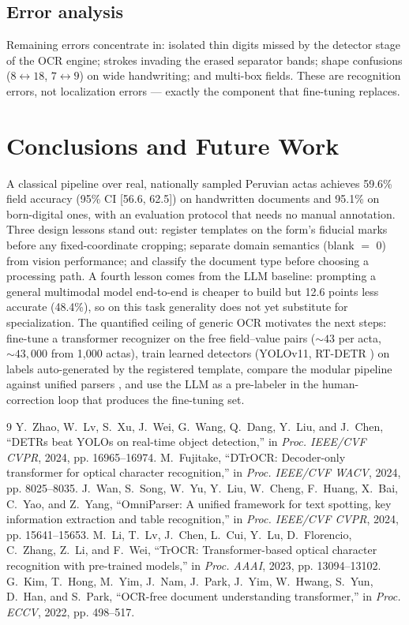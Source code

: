 \documentclass[conference]{IEEEtran}
\begin{document}
\subsection{Error analysis}
Remaining errors concentrate in: isolated thin digits missed by the detector
stage of the OCR engine; strokes invading the erased separator bands;
shape confusions ($8{\leftrightarrow}18$, $7{\leftrightarrow}9$) on wide
handwriting; and multi-box fields. These are recognition errors, not
localization errors --- exactly the component that fine-tuning replaces.

\section{Conclusions and Future Work}
A classical pipeline over real, nationally sampled Peruvian actas achieves
59.6\% field accuracy (95\% CI [56.6, 62.5]) on handwritten documents and
95.1\% on born-digital ones, with an evaluation protocol that needs no manual
annotation. Three design lessons stand out: register templates on the form's
fiducial marks before any fixed-coordinate cropping; separate domain
semantics (blank $=$ 0) from vision performance; and classify the document
type before choosing a processing path. A fourth lesson comes from the LLM
baseline: prompting a general multimodal model end-to-end is cheaper to build
but 12.6 points less accurate (48.4\%), so on this task generality does not
yet substitute for specialization. The quantified ceiling of generic
OCR motivates the next steps: fine-tune a transformer recognizer
\cite{trocr,dtrocr} on the free field--value pairs (${\sim}43$ per acta,
${\sim}43{,}000$ from 1,000 actas), train learned detectors (YOLOv11,
RT-DETR \cite{rtdetr}) on labels auto-generated by the registered template,
compare the modular pipeline against unified parsers \cite{omniparser,donut},
and use the LLM as a pre-labeler in the human-correction loop that produces
the fine-tuning set.

\begin{thebibliography}{9}
 Y.~Zhao, W.~Lv, S.~Xu, J.~Wei, G.~Wang, Q.~Dang, Y.~Liu,
and J.~Chen, ``DETRs beat YOLOs on real-time object detection,'' in
\emph{Proc. IEEE/CVF CVPR}, 2024, pp. 16965--16974.
 M.~Fujitake, ``DTrOCR: Decoder-only transformer for optical
character recognition,'' in \emph{Proc. IEEE/CVF WACV}, 2024, pp. 8025--8035.
 J.~Wan, S.~Song, W.~Yu, Y.~Liu, W.~Cheng, F.~Huang,
X.~Bai, C.~Yao, and Z.~Yang, ``OmniParser: A unified framework for text
spotting, key information extraction and table recognition,'' in \emph{Proc.
IEEE/CVF CVPR}, 2024, pp. 15641--15653.
 M.~Li, T.~Lv, J.~Chen, L.~Cui, Y.~Lu, D.~Florencio, C.~Zhang,
Z.~Li, and F.~Wei, ``TrOCR: Transformer-based optical character recognition
with pre-trained models,'' in \emph{Proc. AAAI}, 2023, pp. 13094--13102.
 G.~Kim, T.~Hong, M.~Yim, J.~Nam, J.~Park, J.~Yim, W.~Hwang,
S.~Yun, D.~Han, and S.~Park, ``OCR-free document understanding transformer,''
in \emph{Proc. ECCV}, 2022, pp. 498--517.
\end{thebibliography}
\end{document}
